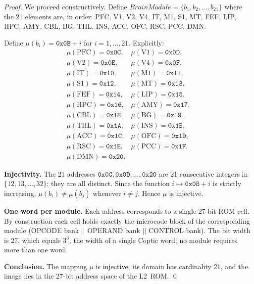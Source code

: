 \begin{proof}
We proceed constructively.
Define $\mathit{BrainModule} = \{b_{1}, b_{2}, \ldots, b_{21}\}$
where the 21 elements are, in order:
PFC, V1, V2, V4, IT, M1, S1, MT, FEF, LIP,
HPC, AMY, CBL, BG, THL, INS, ACC, OFC, RSC, PCC, DMN.

Define $\mu(b_{i}) = \mathtt{0x0B} + i$ for $i = 1, \ldots, 21$.
Explicitly:
\[
\begin{array}{ll}
  \mu(\mathrm{PFC}) = \mathtt{0x0C}, &
  \mu(\mathrm{V1})  = \mathtt{0x0D}, \\
  \mu(\mathrm{V2})  = \mathtt{0x0E}, &
  \mu(\mathrm{V4})  = \mathtt{0x0F}, \\
  \mu(\mathrm{IT})  = \mathtt{0x10}, &
  \mu(\mathrm{M1})  = \mathtt{0x11}, \\
  \mu(\mathrm{S1})  = \mathtt{0x12}, &
  \mu(\mathrm{MT})  = \mathtt{0x13}, \\
  \mu(\mathrm{FEF}) = \mathtt{0x14}, &
  \mu(\mathrm{LIP}) = \mathtt{0x15}, \\
  \mu(\mathrm{HPC}) = \mathtt{0x16}, &
  \mu(\mathrm{AMY}) = \mathtt{0x17}, \\
  \mu(\mathrm{CBL}) = \mathtt{0x18}, &
  \mu(\mathrm{BG})  = \mathtt{0x19}, \\
  \mu(\mathrm{THL}) = \mathtt{0x1A}, &
  \mu(\mathrm{INS}) = \mathtt{0x1B}, \\
  \mu(\mathrm{ACC}) = \mathtt{0x1C}, &
  \mu(\mathrm{OFC}) = \mathtt{0x1D}, \\
  \mu(\mathrm{RSC}) = \mathtt{0x1E}, &
  \mu(\mathrm{PCC}) = \mathtt{0x1F}, \\
  \mu(\mathrm{DMN}) = \mathtt{0x20}. &
\end{array}
\]

\textbf{Injectivity.} The 21 addresses
$\mathtt{0x0C}, \mathtt{0x0D}, \ldots, \mathtt{0x20}$
are 21 consecutive integers in $\{12, 13, \ldots, 32\}$;
they are all distinct.
Since the function $i \mapsto \mathtt{0x0B}+i$ is strictly
increasing, $\mu(b_{i}) \neq \mu(b_{j})$ whenever $i \neq j$.
Hence $\mu$ is injective.

\textbf{One word per module.}
Each address corresponds to a single 27-bit ROM cell.
By construction each cell holds exactly the microcode block of the
corresponding module (OPCODE bank $||$ OPERAND bank $||$ CONTROL bank).
The bit width is 27, which equals $3^{3}$, the width of a single
Coptic word; no module requires more than one word.

\textbf{Conclusion.}
The mapping $\mu$ is injective, its domain has cardinality 21,
and the image lies in the 27-bit address space of the L2~ROM.
\qed
\end{proof}

